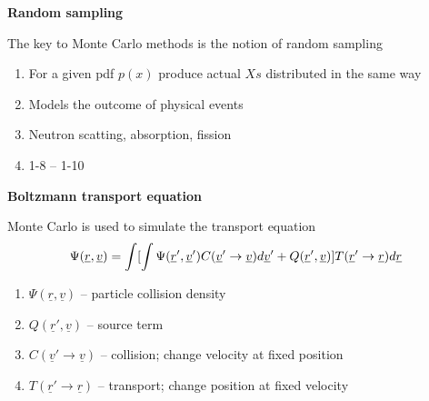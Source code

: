 \documentclass[aspectratio=1610,pdftex,dvipsnames,compress,xcolor={dvipsnames}]{beamer}
\begin{document}
\begin{frame}[plain]{}
    \centering\LARGE\textbf{Random sampling}
\end{frame}


\addtocounter{framenumber}{-1} 
\begin{frame}{The key to Monte Carlo methods is the notion of random sampling}
    \begin{enumerate}[series=outerlist,topsep=0pt,itemsep=21pt,leftmargin=*,label=(\arabic*)]
        \item[]For a given pdf $p(x)$ produce actual $Xs$ distributed in the same way
        \item[]Models the outcome of physical events
        \item[]Neutron scatting, absorption, fission
        \item[]1-8 -- 1-10
    \end{enumerate}
\end{frame}


\begin{frame}[plain]{}
    \centering\LARGE\textbf{Boltzmann transport equation}
\end{frame}


\addtocounter{framenumber}{-1} 
\begin{frame}{Monte Carlo is used to simulate the transport equation}
    \begin{equation}
        \Large
        \Psi(\underline{r},\underline{v}) = \int[\int\Psi(\underline{r}', \underline{v}') C(\underline{v}'\rightarrow\underline{v}) d\underline{v}' + Q(\underline{r}',\underline{v})] T(\underline{r}'\rightarrow\underline{r}) d\underline{r}
    \end{equation}

    \vspace*{\fill}

    \begin{enumerate}[series=outerlist,topsep=0pt,itemsep=21pt,leftmargin=*,label=(\arabic*)]
        \item[]$\Psi(\underline{r}, \underline{v})$ -- particle collision density
        \item[]$Q(\underline{r}', \underline{v})$ -- source term
        \item[]$C(\underline{v}' \rightarrow \underline{v})$ -- collision; change velocity at fixed position
        \item[]$T(\underline{r}' \rightarrow \underline{r})$ -- transport; change position at fixed velocity
    \end{enumerate}
\end{frame}
\end{document}
